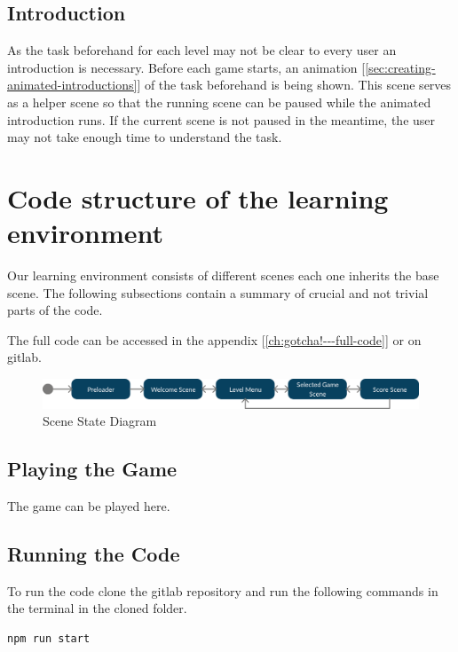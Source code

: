 \subsection{Introduction}\label{subsec:introduction}
As the task beforehand for each level may not be clear to every user an introduction is necessary.
Before each game starts, an animation [\ref{sec:creating-animated-introductions}] of the task beforehand is being shown.
This scene serves as a helper scene so that the running scene can be paused while the animated introduction runs.
If the current scene is not paused in the meantime, the user may not take enough time to understand the task.

\section{Code structure of the learning environment}\label{sec:code-structure-of-the-learning-environment}
Our learning environment consists of different scenes each one inherits the base scene.
The following subsections contain a summary of crucial and not trivial parts of the code.

The full code can be accessed in the appendix [\ref{ch:gotcha!---full-code}] or on gitlab\cite{gitlab-thesis}.

\begin{figure}[H]
    \centering
    \includegraphics[width=1\textwidth]{figures/statediagram}
    \caption{Scene State Diagram}
    \label{fig:statediagram}
\end{figure}

\subsection{Playing the Game}\label{subsec:playing-the-game}
The game can be played here\cite{gotscha}.

\subsection{Running the Code}\label{subsec:running-the-code}
To run the code clone the gitlab repository\cite{gitlab-thesis} and run the following commands in the terminal in the cloned folder.

\begin{lstlisting}[style=TypeScript, caption={BaseScene.ts}]
    npm run start
\end{lstlisting}

